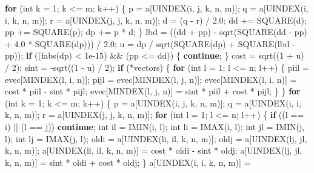 \documentclass[12pt,]{article}
\newenvironment{Shaded}{\begin{snugshade}}{\end{snugshade}}
\newcommand{\ControlFlowTok}[1]{\textcolor[rgb]{0.13,0.29,0.53}{\textbf{#1}}}
\newcommand{\DataTypeTok}[1]{\textcolor[rgb]{0.13,0.29,0.53}{#1}}
\newcommand{\DecValTok}[1]{\textcolor[rgb]{0.00,0.00,0.81}{#1}}
\newcommand{\FloatTok}[1]{\textcolor[rgb]{0.00,0.00,0.81}{#1}}
\newcommand{\NormalTok}[1]{#1}
\begin{document}
\begin{Shaded}
\begin{Highlighting}[]
{{{{{{        \ControlFlowTok{for}\NormalTok{ (}\DataTypeTok{int}\NormalTok{ k = }\DecValTok{1}\NormalTok{; k <= m; k++) \{}
\NormalTok{          p = a[UINDEX(i, j, k, n, m)];}
\NormalTok{          q = a[UINDEX(i, i, k, n, m)];}
\NormalTok{          r = a[UINDEX(j, j, k, n, m)];}
\NormalTok{          d = (q - r) / }\FloatTok{2.0}\NormalTok{;}
\NormalTok{          dd += SQUARE(d);}
\NormalTok{          pp += SQUARE(p);}
\NormalTok{          dp += p * d;}
\NormalTok{        \}}
\NormalTok{        lbd = ((dd + pp) - sqrt(SQUARE(dd - pp) + }\FloatTok{4.0}\NormalTok{ * SQUARE(dp))) / }\FloatTok{2.0}\NormalTok{;}
\NormalTok{        u = dp / sqrt(SQUARE(dp) + SQUARE(lbd - pp));}
        \ControlFlowTok{if}\NormalTok{ ((fabs(dp) < }\FloatTok{1e-15}\NormalTok{) && (pp <= dd)) \{}
          \ControlFlowTok{continue}\NormalTok{;}
\NormalTok{        \}}
\NormalTok{        cost = sqrt((}\DecValTok{1}\NormalTok{ + u) / }\DecValTok{2}\NormalTok{);}
\NormalTok{        sint = -sqrt((}\DecValTok{1}\NormalTok{ - u) / }\DecValTok{2}\NormalTok{);}
        \ControlFlowTok{if}\NormalTok{ (*vectors) \{}
          \ControlFlowTok{for}\NormalTok{ (}\DataTypeTok{int}\NormalTok{ l = }\DecValTok{1}\NormalTok{; l <= n; l++) \{}
\NormalTok{            piil = evec[MINDEX(l, i, n)];}
\NormalTok{            pijl = evec[MINDEX(l, j, n)];}
\NormalTok{            evec[MINDEX(l, i, n)] = cost * piil - sint * pijl;}
\NormalTok{            evec[MINDEX(l, j, n)] = sint * piil + cost * pijl;}
\NormalTok{          \}}
\NormalTok{        \}}
        \ControlFlowTok{for}\NormalTok{ (}\DataTypeTok{int}\NormalTok{ k = }\DecValTok{1}\NormalTok{; k <= m; k++) \{}
\NormalTok{          p = a[UINDEX(i, j, k, n, m)];}
\NormalTok{          q = a[UINDEX(i, i, k, n, m)];}
\NormalTok{          r = a[UINDEX(j, j, k, n, m)];}
          \ControlFlowTok{for}\NormalTok{ (}\DataTypeTok{int}\NormalTok{ l = }\DecValTok{1}\NormalTok{; l <= n; l++) \{}
            \ControlFlowTok{if}\NormalTok{ ((l == i) || (l == j))}
              \ControlFlowTok{continue}\NormalTok{;}
            \DataTypeTok{int}\NormalTok{ il = IMIN(i, l);}
            \DataTypeTok{int}\NormalTok{ li = IMAX(i, l);}
            \DataTypeTok{int}\NormalTok{ jl = IMIN(j, l);}
            \DataTypeTok{int}\NormalTok{ lj = IMAX(j, l);}
\NormalTok{            oldi = a[UINDEX(li, il, k, n, m)];}
\NormalTok{            oldj = a[UINDEX(lj, jl, k, n, m)];}
\NormalTok{            a[UINDEX(li, il, k, n, m)] = cost * oldi - sint * oldj;}
\NormalTok{            a[UINDEX(lj, jl, k, n, m)] = sint * oldi + cost * oldj;}
\NormalTok{          \}}
\NormalTok{          a[UINDEX(i, i, k, n, m)] =}
}}}}}}
\end{Highlighting}
\end{Shaded}
\end{document}
